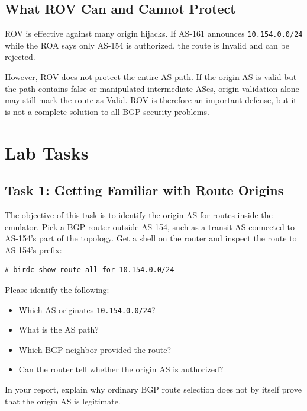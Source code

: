 \subsection{What ROV Can and Cannot Protect}

ROV is effective against many origin hijacks. If AS-161 announces
\texttt{10.154.0.0/24} while the ROA says only AS-154 is authorized, the route
is Invalid and can be rejected.

However, ROV does not protect the entire AS path. If the origin AS is valid but
the path contains false or manipulated intermediate ASes, origin validation
alone may still mark the route as Valid. ROV is therefore an important defense,
but it is not a complete solution to all BGP security problems.


\section{Lab Tasks}

\subsection{Task 1: Getting Familiar with Route Origins}

The objective of this task is to identify the origin AS for routes inside the
emulator. Pick a BGP router outside AS-154, such as a transit AS connected to
AS-154's part of the topology. Get a shell on the router and inspect the route
to AS-154's prefix:

\begin{lstlisting}
# birdc show route all for 10.154.0.0/24
\end{lstlisting}

Please identify the following:

\begin{itemize}[noitemsep]
\item Which AS originates \texttt{10.154.0.0/24}?
\item What is the AS path?
\item Which BGP neighbor provided the route?
\item Can the router tell whether the origin AS is authorized?
\end{itemize}

In your report, explain why ordinary BGP route selection does not by itself
prove that the origin AS is legitimate.

